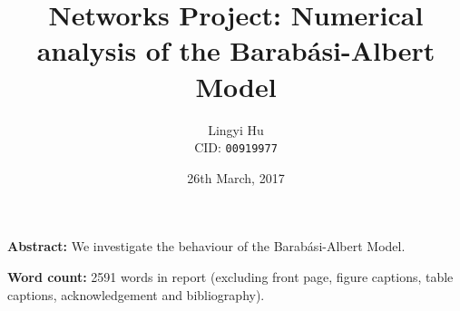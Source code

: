 


\title{Networks Project: Numerical analysis of the Barab\'asi-Albert Model}
\date{26th March, 2017}
\author{Lingyi Hu\\ CID: \texttt{00919977}}
\maketitle

\vspace*{2cm}
\noindent
{\bf Abstract:} We investigate the behaviour of the Barab\'asi-Albert Model.


\vspace*{2cm}
\noindent
{\bf Word count:}
2591 words in report (excluding front page, figure captions, table captions, acknowledgement and bibliography).


\newpage





\newpage
\noindent
\vspace*{2cm}

\printbibliography[heading=bibintoc]


